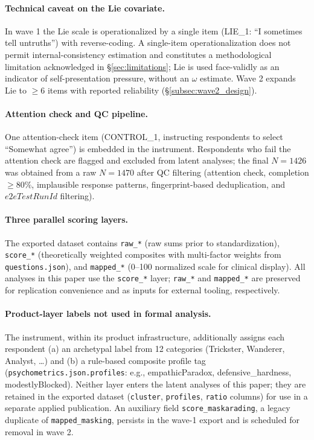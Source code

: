 \paragraph{Technical caveat on the Lie covariate.} In wave 1 the Lie scale is operationalized by a single item (LIE\_1: ``I sometimes tell untruths'') with reverse-coding. A single-item operationalization does not permit internal-consistency estimation and constitutes a methodological limitation acknowledged in §\ref{sec:limitations}; Lie is used face-validly as an indicator of self-presentation pressure, without an $\omega$ estimate. Wave 2 expands Lie to $\geq 6$ items with reported reliability (§\ref{subsec:wave2_design}).

\paragraph{Attention check and QC pipeline.} One attention-check item (CONTROL\_1, instructing respondents to select ``Somewhat agree'') is embedded in the instrument. Respondents who fail the attention check are flagged and excluded from latent analyses; the final $N = 1426$ was obtained from a raw $N = 1470$ after QC filtering (attention check, completion $\geq 80\%$, implausible response patterns, fingerprint-based deduplication, and $e2eTestRunId$ filtering).

\paragraph{Three parallel scoring layers.} The exported dataset contains \texttt{raw\_*} (raw sums prior to standardization), \texttt{score\_*} (theoretically weighted composites with multi-factor weights from \texttt{questions.json}), and \texttt{mapped\_*} (0--100 normalized scale for clinical display). All analyses in this paper use the \texttt{score\_*} layer; \texttt{raw\_*} and \texttt{mapped\_*} are preserved for replication convenience and as inputs for external tooling, respectively.

\paragraph{Product-layer labels not used in formal analysis.} The instrument, within its product infrastructure, additionally assigns each respondent (a) an archetypal label from 12 categories (Trickster, Wanderer, Analyst, \dots{}) and (b) a rule-based composite profile tag (\texttt{psychometrics.json.profiles}: e.g., empathicParadox, defensive\_hardness, modestlyBlocked). Neither layer enters the latent analyses of this paper; they are retained in the exported dataset (\texttt{cluster}, \texttt{profiles}, \texttt{ratio} columns) for use in a separate applied publication. An auxiliary field \texttt{score\_maskarading}, a legacy duplicate of \texttt{mapped\_masking}, persists in the wave-1 export and is scheduled for removal in wave 2.

